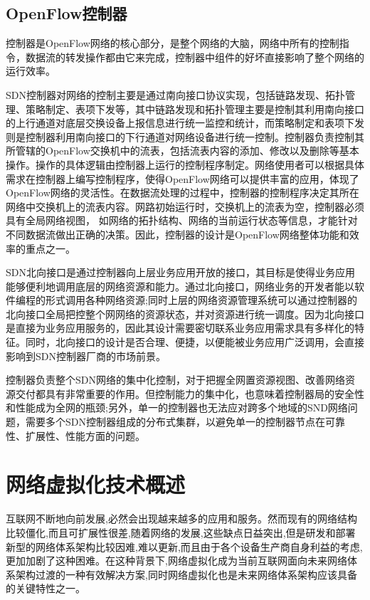 \subsection{OpenFlow控制器}
控制器是OpenFlow网络的核心部分，是整个网络的大脑，网络中所有的控制指令，数据流的转发操作都由它来完成，控制器中组件的好坏直接影响了整个网络的运行效率。


SDN控制器对网络的控制主要是通过南向接口协议实现，包括链路发现、拓扑管理、策略制定、表项下发等，其中链路发现和拓扑管理主要是控制其利用南向接口的上行通道对底层交换设备上报信息进行统一监控和统计，而策略制定和表项下发则是控制器利用南向接口的下行通道对网络设备进行统一控制。控制器负责控制其所管辖的OpenFlow交换机中的流表，包括流表内容的添加、修改以及删除等基本操作。操作的具体逻辑由控制器上运行的控制程序制定。网络使用者可以根据具体需求在控制器上编写控制程序，使得OpenFlow网络可以提供丰富的应用，体现了 OpenFlow网络的灵活性。在数据流处理的过程中，控制器的控制程序决定其所在网络中交换机上的流表内容。网路初始运行时，交换机上的流表为空，控制器必须具有全局网络视图， 如网络的拓扑结构、网络的当前运行状态等信息，才能针对不同数据流做出正确的决策。因此，控制器的设计是OpenFlow网络整体功能和效率的重点之一。

SDN北向接口是通过控制器向上层业务应用开放的接口，其目标是使得业务应用能够便利地调用底层的网络资源和能力。通过北向接口，网络业务的开发者能以软件编程的形式调用各种网络资源;同时上层的网络资源管理系统可以通过控制器的北向接口全局把控整个网网络的资源状态，并对资源进行统一调度。因为北向接口是直接为业务应用服务的，因此其设计需要密切联系业务应用需求具有多样化的特征。同时，北向接口的设计是否合理、便捷，以便能被业务应用广泛调用，会直接影响到SDN控制器厂商的市场前景。

控制器负责整个SDN网络的集中化控制，对于把握全网置资源视图、改善网络资源交付都具有非常重要的作用。但控制能力的集中化，也意味着控制器局的安全性和性能成为全网的瓶颈;另外，单一的控制器也无法应对跨多个地域的SND网络问题，需要多个SDN控制器组成的分布式集群，以避免单一的控制器节点在可靠性、扩展性、性能方面的问题。
\section{网络虚拟化技术概述}
互联网不断地向前发展,必然会出现越来越多的应用和服务。然而现有的网络结构比较僵化,而且可扩展性很差,随着网络的发展,这些缺点日益突出,但是研发和部署新型的网络体系架构比较因难,难以更新,而且由于各个设备生产商自身利益的考虑,更加加剧了这种困难。在这种背景下,网络虚拟化成为当前互联网面向未来网络体系架构过渡的一种有效解决方案,同时网络虚拟化也是未来网络体系架构应该具备的关键特性之一。

